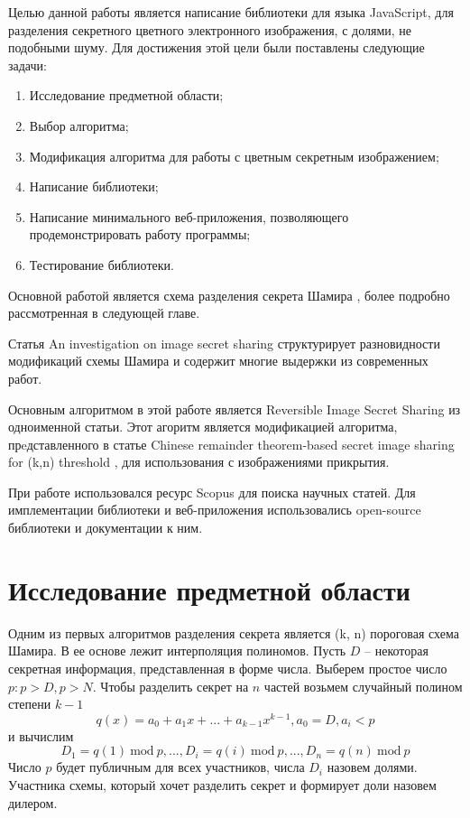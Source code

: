 \documentclass[a4paper,article,14pt]{extarticle}
\newcommand{\Mod}[1]{\ \mathrm{mod}\ #1}
\begin{document}
Целью данной работы является написание библиотеки для языка JavaScript, для разделения секретного цветного электронного изображения,
с долями, не подобными шуму. Для достижения этой цели были поставлены следующие задачи:
\begin{enumerate}
    \item Исследование предметной области;
    \item Выбор алгоритма;
    \item Модификация алгоритма для работы с цветным секретным изображением;
    \item Написание библиотеки;
    \item Написание минимального веб-приложения, позволяющего продемонстрировать работу программы;
    \item Тестирование библиотеки.
\end{enumerate}

\newpage
{}
Основной работой является схема разделения секрета Шамира \cite{shamir}, более подробно рассмотренная в следующей главе.

Статья \flqq An investigation on image secret sharing\frqq \cite{review} структурирует разновидности модификаций схемы Шамира и содержит многие выдержки из современных работ.

Основным алгоритмом в этой работе является Reversible Image Secret Sharing \cite{RISS} из одноименной статьи. Этот агоритм является модификацией
алгоритма, прeдставленного в статье Chinese remainder theorem-based secret image sharing for (k,n) threshold \cite{CRTSIS}, для использования
с изображениями прикрытия.

При работе использовался ресурс Scopus \cite{scopus} для поиска научных статей. 
    Для имплементации библиотеки и веб-приложения использовались open-source библиотеки и документации
\cite{react} \cite{image-js} \cite{Big.js} к ним.

\newpage
\section{Исследование предметной области}
Одним из первых алгоритмов разделения секрета является (k, n) пороговая схема Шамира\cite{shamir}. В ее основе лежит интерполяция 
полиномов. Пусть $D$ -- некоторая секретная информация, представленная в форме числа. Выберем простое число $p: p > D, p > N$.
Чтобы разделить секрет на $n$ частей возьмем случайный полином степени $k-1$ 
\begin{equation}
    q(x) = a_0 + a_1 x +...+ a_{k-1} x^{k-1},
    a_0=D, a_i<p
\end{equation}
и вычислим
\begin{equation}
    D_1=q(1)\Mod{p}, ..., D_i=q(i)\Mod{p}, ..., D_n=q(n)\Mod{p}
\end{equation}
Число $p$ будет публичным для всех участников, числа $D_i$ назовем долями. Участника схемы, который хочет разделить секрет и 
формирует доли назовем дилером.
\end{document}
